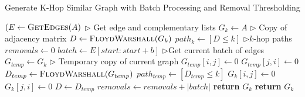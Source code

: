\begin{algorithm}[H]
\caption{Generate K-Hop Similar Graph with Batch Processing and Removal Thresholding}
\label{alg:improved_khop}
\begin{algorithmic}[1]
\STATE $(E \gets \textsc{GetEdges}(A)$ \hfill $\triangleright$ Get edge and complementary lists
\STATE $G_{k} \gets A$ \hfill $\triangleright$ Copy of adjacency matrix
\STATE $D \gets \textsc{FloydWarshall}(G_{k})$
\STATE $path_{k} \gets [D\leq k]$ \hfill $\triangleright$$k$-hop paths
\STATE $removals \gets 0$
    \STATE $batch \gets E[start:start+b]$ \hfill $\triangleright$Get current batch of edges
    \STATE $G_{temp} \gets G_{k}$ \hfill $\triangleright$ Temporary copy of current graph
        \STATE $G_{temp}[i,j] \gets 0$
        \STATE $G_{temp}[j,i] \gets 0$
    \ENDFOR  
    \STATE $D_{temp} \gets \textsc{FloydWarshall}(G_{temp})$
    \STATE $path_{temp} \gets [D_{temp} \leq k]$
            \STATE $G_{k}[i,j] \gets 0$
            \STATE $G_{k}[j,i] \gets 0$
        \ENDFOR
        \STATE $D \gets D_{temp}$
        \STATE $removals \gets removals + |batch|$
    \ENDIF   
        \STATE \textbf{return} $G_{k}$
    \ENDIF
\ENDFOR
\STATE \textbf{return} $G_{k}$
\end{algorithmic}
\end{algorithm}